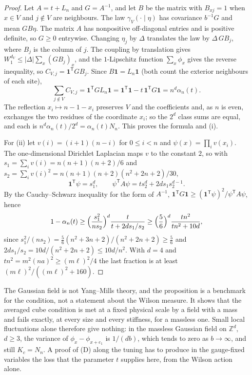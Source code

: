 \documentclass[11pt]{amsart}
\theoremstyle{definition}
\theoremstyle{remark}
\numberwithin{equation}{section}
\newcommand{\Z}{\mathbb{Z}}
\begin{document}
\begin{proof}
Let $A=t+L_n$ and $G=A^{-1}$, and let $B$ be the matrix with $B_{xj}=1$ when
$x\in V$ and $j\notin V$ are neighbours. The law $\gamma_V(\cdot\mid\eta)$ has
covariance $b^{-1}G$ and mean $GB\eta$. The matrix $A$ has nonpositive
off-diagonal entries and is positive definite, so $G\ge0$ entrywise. Changing
$\eta_j$ by $\Delta$ translates the law by $\Delta\,GB_j$, where $B_j$ is the
column of $j$. The coupling by translation gives $W_1^{d_V}\le|\Delta|
\sum_x(GB_j)_x$, and the $1$-Lipschitz function $\sum_x\phi_x$ gives the
reverse inequality, so $C_{V,j}=\mathbf1^{\mathsf T}GB_j$. Since
$B\mathbf1=L_n\mathbf1$ (both count the exterior neighbours of each site),
\[
\sum_{j\notin V}C_{V,j}=\mathbf1^{\mathsf T}GL_n\mathbf1
=\mathbf1^{\mathsf T}\mathbf1-t\,\mathbf1^{\mathsf T}G\mathbf1
=n^d\alpha_n(t).
\]
The reflection $x_i\mapsto n-1-x_i$ preserves $V$ and the coefficients and,
as $n$ is even, exchanges the two residues of the coordinate $x_i$; so the
$2^d$ class sums are equal, and each is $n^d\alpha_n(t)/2^d=\alpha_n(t)N_n$.
This proves the formula and (i).

For (ii) let $v(i)=(i+1)(n-i)$ for $0\le i<n$ and $\psi(x)=\prod_iv(x_i)$.
The one-dimensional Dirichlet Laplacian maps $v$ to the constant $2$, so with
$s_1=\sum_iv(i)=n(n+1)(n+2)/6$ and $s_2=\sum_iv(i)^2=n(n+1)(n+2)(n^2+2n+2)/30$,
\[
\mathbf1^{\mathsf T}\psi=s_1^d,\qquad
\psi^{\mathsf T}A\psi=ts_2^d+2ds_1s_2^{d-1}.
\]
By the Cauchy--Schwarz inequality for the form of $A^{-1}$,
$\mathbf1^{\mathsf T}G\mathbf1\ge(\mathbf1^{\mathsf T}\psi)^2/\psi^{\mathsf T}
A\psi$, hence
\[
1-\alpha_n(t)\ge\Bigl(\frac{s_1^2}{ns_2}\Bigr)^d\frac t{t+2ds_1/s_2}
\ge\Bigl(\frac56\Bigr)^d\frac{tn^2}{tn^2+10d},
\]
since $s_1^2/(ns_2)=\frac56(n^2+3n+2)/(n^2+2n+2)\ge\frac56$ and
$2ds_1/s_2=10d/(n^2+2n+2)\le10d/n^2$. With $d=4$ and $tn^2=m^2(na)^2\ge
(m\ell)^2/4$ the last fraction is at least $(m\ell)^2/((m\ell)^2+160)$.
\end{proof}

The Gaussian field is not Yang--Mills theory, and the proposition is a
benchmark for the condition, not a statement about the Wilson measure. It
shows that the averaged cube condition is met at a fixed physical scale by a
field with a mass and fails exactly, at every size and every stiffness, for
a massless one. Small local fluctuations alone therefore give nothing: in the
massless Gaussian field on $\Z^d$, $d\ge3$, the variance of
$\phi_x-\phi_{x+e_1}$ is $1/(db)$,
which tends to zero as $b\to\infty$, and still $K_c=N_n$. A proof of (D)
along the tuning has to produce in the gauge-fixed variables the loss that
the parameter $t$ supplies here, from the Wilson action alone.
\end{document}
